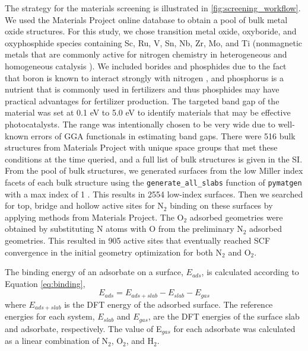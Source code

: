 The strategy for the materials screening is illustrated in \ref{fig:screening_workflow}. We used the Materials Project \cite{Jain2013} online database to obtain a pool of bulk metal oxide structures. For this study, we chose transition metal oxide, oxyboride, and oxyphosphide species containing Sc, Ru, V, Sn, Nb, Zr, Mo, and Ti (nonmagnetic metals that are commonly active for nitrogen chemistry in heterogeneous and homogeneous catalysis \cite{ Schrauzer_1977, Schrauzer_2011, schrauzer1986homogeneous, ling2018single, Yandulov_2003, kuriyama2014catalytic, fajardo2017catalytic, Foster2018CatalystsAmmonia, yang2018mechanistic, li2019amorphous, ren2020density, tan2021zr}). We included borides and phosphides due to the fact that boron is known to interact strongly with nitrogen \cite{Jepsen2014BoronnitrogenStorage, Legare2018NitrogenBoron}, and phosphorus is a nutrient that is commonly used in fertilizers and thus phosphides may have practical advantages for fertilizer production. The targeted band gap of the material was set at 0.1 eV to 5.0 eV to identify materials that may be effective photocatalysts. The range was intentionally chosen to be very wide due to well-known errors of GGA functionals in estimating band gaps. There were 516 bulk structures from Materials Project with unique space groups that met these conditions at the time queried, and a full list of bulk structures is given in the SI. From the pool of bulk structures, we generated surfaces from the low Miller index facets of each bulk structure using the \texttt{generate\_all\_slabs} function of \texttt{pymatgen} with a max index of 1 \cite{Ong2013PythonAnalysis}. This results in 2554 low-index surfaces. Then we searched for top, bridge and hollow active sites for N$_2$ binding on these surfaces by applying methods from Materials Project. The O$_2$ adsorbed geometries were obtained by substituting N atoms with O from the preliminary N$_2$ adsorbed geometries. This resulted in 905 active sites that eventually reached SCF convergence in the initial geometry optimization for both N$_2$ and O$_2$. 

The binding energy of an adsorbate on a surface, $E_{ads}$, is calculated according to Equation \ref{eq:binding},
\begin{equation}
    \label{eq:binding}
    E_{ads} = E_{ads+slab}- E_{slab} - E_{gas}
\end{equation}
where $E_{ads+slab}$ is the DFT energy of the adsorbed surface. The reference energies for each system, $E_{slab}$ and $ E_{gas}$, are the DFT energies of the surface slab and adsorbate, respectively. The value of E$_{gas}$ for each adsorbate was calculated as a linear combination of N$_2$, O$_2$, and H$_2$. 

